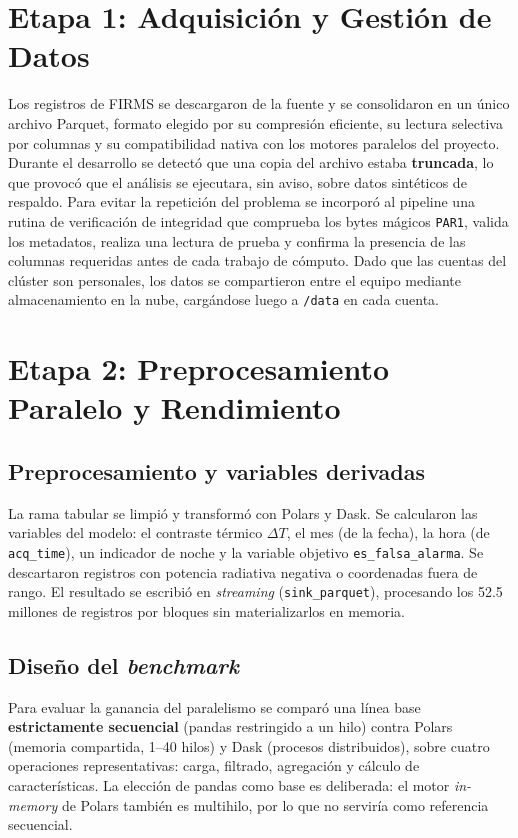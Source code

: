 \documentclass[conference]{IEEEtran}
\begin{document}
\section{Etapa 1: Adquisición y Gestión de Datos}
\label{sec:e1}
Los registros de FIRMS se descargaron de la fuente y se consolidaron en un único archivo Parquet, formato elegido por su compresión eficiente, su lectura selectiva por columnas y su compatibilidad nativa con los motores paralelos del proyecto. Durante el desarrollo se detectó que una copia del archivo estaba \textbf{truncada}, lo que provocó que el análisis se ejecutara, sin aviso, sobre datos sintéticos de respaldo. Para evitar la repetición del problema se incorporó al pipeline una rutina de verificación de integridad que comprueba los bytes mágicos \texttt{PAR1}, valida los metadatos, realiza una lectura de prueba y confirma la presencia de las columnas requeridas antes de cada trabajo de cómputo. Dado que las cuentas del clúster son personales, los datos se compartieron entre el equipo mediante almacenamiento en la nube, cargándose luego a \texttt{/data} en cada cuenta.

\section{Etapa 2: Preprocesamiento Paralelo y Rendimiento}
\label{sec:e2}
\subsection{Preprocesamiento y variables derivadas}
La rama tabular se limpió y transformó con Polars y Dask. Se calcularon las variables del modelo: el contraste térmico $\Delta T$, el mes (de la fecha), la hora (de \texttt{acq\_time}), un indicador de noche y la variable objetivo \texttt{es\_falsa\_alarma}. Se descartaron registros con potencia radiativa negativa o coordenadas fuera de rango. El resultado se escribió en \textit{streaming} (\texttt{sink\_parquet}), procesando los 52.5 millones de registros por bloques sin materializarlos en memoria.

\subsection{Diseño del \textit{benchmark}}
Para evaluar la ganancia del paralelismo se comparó una línea base \textbf{estrictamente secuencial} (pandas restringido a un hilo) contra Polars (memoria compartida, 1--40 hilos) y Dask (procesos distribuidos), sobre cuatro operaciones representativas: carga, filtrado, agregación y cálculo de características. La elección de pandas como base es deliberada: el motor \textit{in-memory} de Polars también es multihilo, por lo que no serviría como referencia secuencial.
\end{document}
